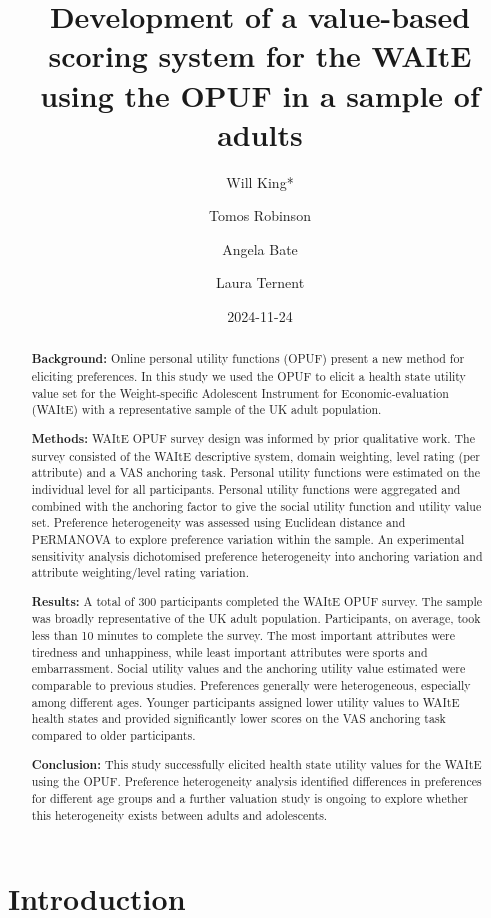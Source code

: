 \documentclass[
  letterpaper,
  DIV=11,
  numbers=noendperiod]{scrartcl}
\title{Development of a value-based scoring system for the WAItE using
the OPUF in a sample of adults}
\author{Will King* \and Tomos Robinson \and Angela Bate \and Laura
Ternent}
\date{2024-11-24}
\begin{document}
\maketitle
\begin{abstract}
\textbf{Background:} Online personal utility functions (OPUF) present a
new method for eliciting preferences. In this study we used the OPUF to
elicit a health state utility value set for the Weight-specific
Adolescent Instrument for Economic-evaluation (WAItE) with a
representative sample of the UK adult population.

\textbf{Methods:} WAItE OPUF survey design was informed by prior
qualitative work. The survey consisted of the WAItE descriptive system,
domain weighting, level rating (per attribute) and a VAS anchoring task.
Personal utility functions were estimated on the individual level for
all participants. Personal utility functions were aggregated and
combined with the anchoring factor to give the social utility function
and utility value set. Preference heterogeneity was assessed using
Euclidean distance and PERMANOVA to explore preference variation within
the sample. An experimental sensitivity analysis dichotomised preference
heterogeneity into anchoring variation and attribute weighting/level
rating variation.

\textbf{Results:} A total of 300 participants completed the WAItE OPUF
survey. The sample was broadly representative of the UK adult
population. Participants, on average, took less than 10 minutes to
complete the survey. The most important attributes were tiredness and
unhappiness, while least important attributes were sports and
embarrassment. Social utility values and the anchoring utility value
estimated were comparable to previous studies. Preferences generally
were heterogeneous, especially among different ages. Younger
participants assigned lower utility values to WAItE health states and
provided significantly lower scores on the VAS anchoring task compared
to older participants.

\textbf{Conclusion:} This study successfully elicited health state
utility values for the WAItE using the OPUF. Preference heterogeneity
analysis identified differences in preferences for different age groups
and a further valuation study is ongoing to explore whether this
heterogeneity exists between adults and adolescents.
\end{abstract}


\section{Introduction}\label{sec-introduction}
\end{document}
